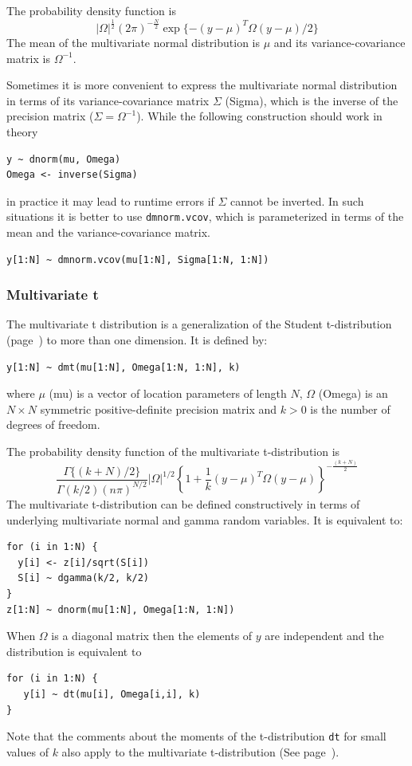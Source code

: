 \documentclass[11pt, a4paper, titlepage]{report}
\begin{document}
The probability density function is
\[
|\Omega|^{\frac{1}{2}} \left(2\pi\right)^{-\frac{N}{2}}
\exp\{-(y-\mu)^T \Omega (y-\mu) / 2\}
\]
The mean of the multivariate normal distribution is $\mu$ and its
variance-covariance matrix is $\Omega^{-1}$.

Sometimes it is more convenient to express the multivariate normal
distribution in terms of its variance-covariance matrix $\Sigma$ (Sigma),
which is the inverse of the precision matrix ($\Sigma = \Omega^{-1}$).
While the following construction should work in theory
\begin{verbatim}
y ~ dnorm(mu, Omega)
Omega <- inverse(Sigma)
\end{verbatim}
in practice it may lead to runtime errors if $\Sigma$ cannot be inverted.
In such situations it is better to use \texttt{dmnorm.vcov}, which
is parameterized in terms of the mean and the variance-covariance matrix.
\begin{verbatim}
y[1:N] ~ dmnorm.vcov(mu[1:N], Sigma[1:N, 1:N])
\end{verbatim}

\subsubsection{Multivariate t}

The multivariate t distribution is a generalization of the Student
t-distribution (page~\pageref{bugs:dt}) to more than one dimension. It
is defined by:
\begin{verbatim}
y[1:N] ~ dmt(mu[1:N], Omega[1:N, 1:N], k)
\end{verbatim}
where $\mu$ (mu) is a vector of location parameters of length $N$,
$\Omega$ (Omega) is an $N \times N$ symmetric positive-definite
precision matrix and $k > 0$ is the number of degrees of freedom.

The probability density function of the multivariate t-distribution is
\[
\frac{\textstyle \Gamma \{(k+N)/2\}}{\textstyle \Gamma(k/2) (n\pi)^{N/2}}
|\Omega|^{1/2}
\left\{1 + \frac{1}{k} (y - \mu)^T \Omega (y - \mu) \right\}^{-\frac{(k+N)}{2}}
\]
The multivariate t-distribution can be defined constructively in terms
of underlying multivariate normal and gamma random variables. It is
equivalent to:
\begin{verbatim}
for (i in 1:N) {
  y[i] <- z[i]/sqrt(S[i])
  S[i] ~ dgamma(k/2, k/2)
}
z[1:N] ~ dnorm(mu[1:N], Omega[1:N, 1:N])
\end{verbatim}

When $\Omega$ is a diagonal matrix then the elements of $y$ are independent
and the distribution is equivalent to 
\begin{verbatim}
for (i in 1:N) {
   y[i] ~ dt(mu[i], Omega[i,i], k)
}
\end{verbatim}
Note that the comments about the moments of the t-distribution \texttt{dt} for
small values of $k$ also apply to the multivariate t-distribution (See
page~\pageref{bugs:dt}).
\end{document}
